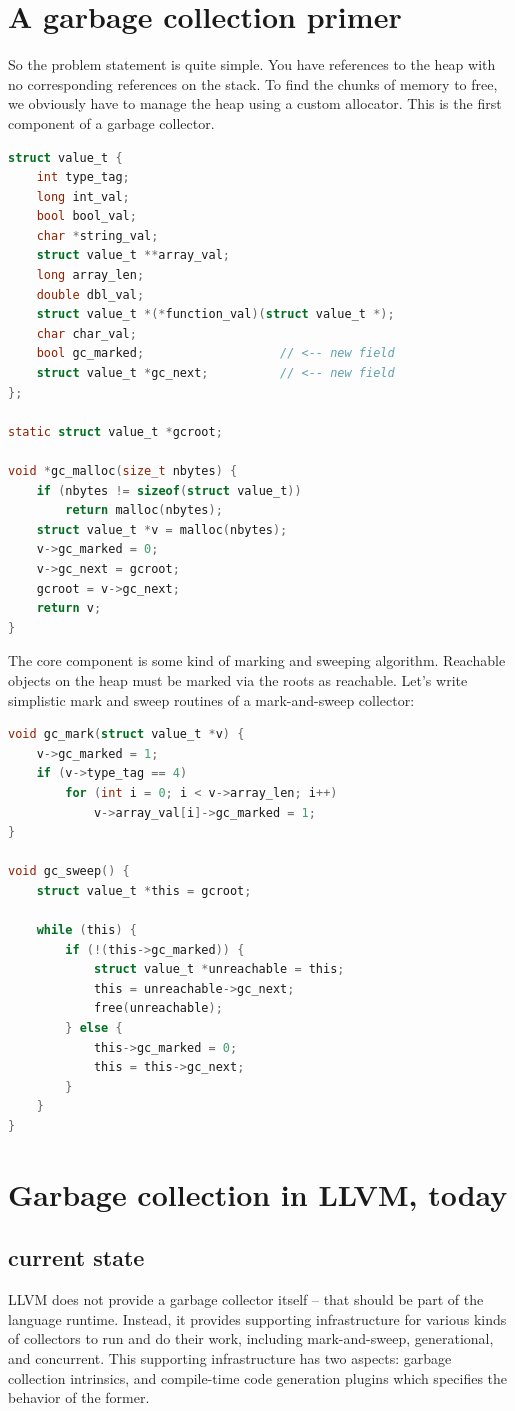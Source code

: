 \documentclass{article}
\begin{document}
\section{A garbage collection primer}
So the problem statement is quite simple. You have references to the
heap with no corresponding references on the stack. To find the chunks
of memory to free, we obviously have to manage the heap using a custom
allocator. This is the first component of a garbage collector.
\begin{lstlisting}[language=c]
struct value_t {
	int type_tag;
	long int_val;
	bool bool_val;
	char *string_val;
	struct value_t **array_val;
	long array_len;
	double dbl_val;
	struct value_t *(*function_val)(struct value_t *);
	char char_val;
	bool gc_marked;                   // <-- new field
	struct value_t *gc_next;          // <-- new field
};

static struct value_t *gcroot;

void *gc_malloc(size_t nbytes) {
	if (nbytes != sizeof(struct value_t))
		return malloc(nbytes);
	struct value_t *v = malloc(nbytes);
	v->gc_marked = 0;
	v->gc_next = gcroot;
	gcroot = v->gc_next;
	return v;
}
\end{lstlisting}
The core component is some kind of marking and sweeping
algorithm. Reachable objects on the heap must be marked via the roots
as reachable. Let's write simplistic mark and sweep routines of a
mark-and-sweep collector:
\begin{lstlisting}[language=c]
void gc_mark(struct value_t *v) {
	v->gc_marked = 1;
	if (v->type_tag == 4)
		for (int i = 0; i < v->array_len; i++)
			v->array_val[i]->gc_marked = 1;
}

void gc_sweep() {
	struct value_t *this = gcroot;

	while (this) {
		if (!(this->gc_marked)) {
			struct value_t *unreachable = this;
			this = unreachable->gc_next;
			free(unreachable);
		} else {
			this->gc_marked = 0;
			this = this->gc_next;
		}
	}
}
\end{lstlisting}

\section{Garbage collection in LLVM, today}
\subsection{current state}
LLVM does not provide a garbage collector itself -- that should be
part of the language runtime. Instead, it provides supporting
infrastructure for various kinds of collectors to run and do their
work, including mark-and-sweep, generational, and concurrent. This
supporting infrastructure has two aspects: garbage collection
intrinsics, and compile-time code generation plugins which specifies
the behavior of the former.\\
\end{document}
